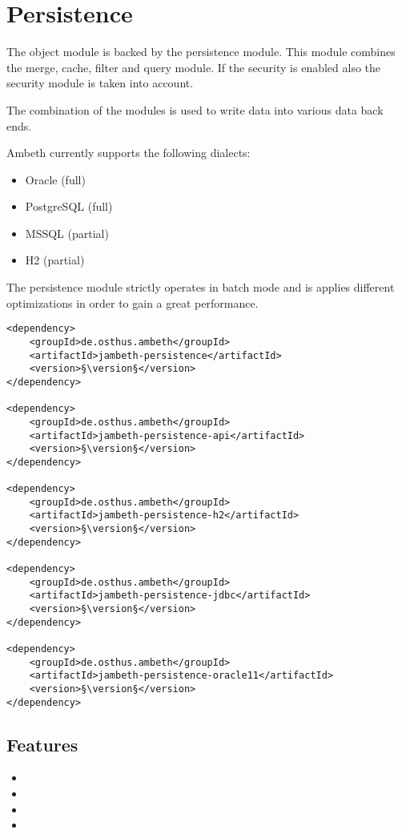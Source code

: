 \section{Persistence}
\label{module:Persistence}
\ClearAPI
The object module is backed by the persistence module. This module combines the merge, cache, filter and query module. If the security is enabled also the security module is taken into account.

The combination of the modules is used to write data into various data back ends.

Ambeth currently supports the following dialects:
\begin{itemize}
	\item Oracle (full)
	\item PostgreSQL (full)
	\item MSSQL (partial)
	\item H2 (partial)
\end{itemize}

The persistence module strictly operates in batch mode and is applies different optimizations in order to gain a great performance.

\TODO
\begin{lstlisting}[style=POM,caption={Maven modules to use \emph{Ambeth Persistence}}]
<dependency>
	<groupId>de.osthus.ambeth</groupId>
	<artifactId>jambeth-persistence</artifactId>
	<version>§\version§</version>
</dependency>

<dependency>
	<groupId>de.osthus.ambeth</groupId>
	<artifactId>jambeth-persistence-api</artifactId>
	<version>§\version§</version>
</dependency>

<dependency>
	<groupId>de.osthus.ambeth</groupId>
	<artifactId>jambeth-persistence-h2</artifactId>
	<version>§\version§</version>
</dependency>

<dependency>
	<groupId>de.osthus.ambeth</groupId>
	<artifactId>jambeth-persistence-jdbc</artifactId>
	<version>§\version§</version>
</dependency>

<dependency>
	<groupId>de.osthus.ambeth</groupId>
	<artifactId>jambeth-persistence-oracle11</artifactId>
	<version>§\version§</version>
</dependency>
\end{lstlisting}
\subsection{Features}
\begin{itemize}
	\item {}
	\item {}	
	\item {}	
	\item {}
\end{itemize}

